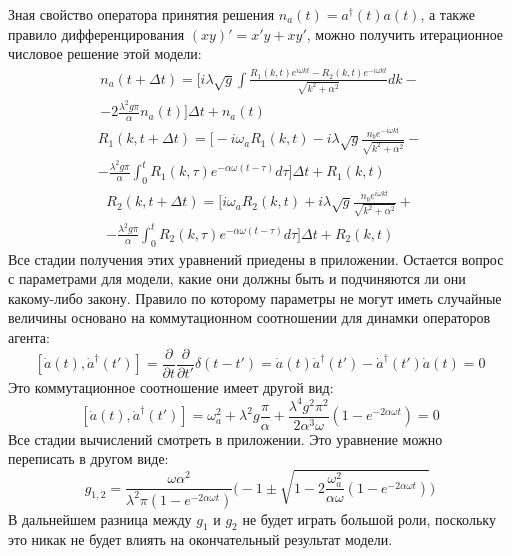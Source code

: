 Зная свойство оператора принятия решения $n_{a}(t) = a^{\dagger}(t) a(t)$, а также правило
дифференцирования $(xy)' = x'y + xy'$, можно получить итерационное числовое решение этой модели:
\begin{multline}
    n_{a}(t + \Delta t) =
    \Biggl[i \lambda \sqrt{g} \int \frac{R_{1}(k,t) e^{i \omega k t} - R_{2}(k,t) e^{-i \omega k t}}{\sqrt{k^{2} + \alpha^2}} dk - \\
    - 2 \frac{\lambda^{2} g \pi}{\alpha} n_{a}(t) \Biggr] \Delta t + n_{a}(t)
\end{multline}
\begin{multline}
    R_{1}(k,t + \Delta t) =
    \Biggl[-i \omega_{a} R_{1}(k,t)
    -i \lambda \sqrt{g} \frac{n_{b} e^{-i \omega k t}}{\sqrt{k^{2} + \alpha^2}} - \\
    -\frac{\lambda^{2} g \pi}{\alpha} \int_{0}^{t} R_{1}(k,\tau) e^{- \alpha \omega (t - \tau)} d\tau \Biggr] \Delta t + R_{1}(k,t)
\end{multline}
\begin{multline}
    R_{2}(k,t + \Delta t) =
    \Biggl[i \omega_{a} R_{2}(k,t)
    + i \lambda \sqrt{g} \frac{n_{b} e^{i \omega k t}}{\sqrt{k^{2} + \alpha^2}} + \\
    - \frac{\lambda^{2} g \pi}{\alpha} \int_{0}^{t} R_{2}(k,\tau) e^{- \alpha \omega (t - \tau)} d\tau \Biggr] \Delta t + R_{2}(k,t)
\end{multline}
Все стадии получения этих уравнений приедены в приложении.
Остается вопрос с параметрами для модели, какие они должны быть и подчиняются ли они какому-либо закону.
Правило по которому параметры не могут иметь случайные величины основано на коммутационном соотношении
для динамки операторов агента:
\begin{equation}\label{dynamic_comm-1}
    [\dot{a}(t),\dot{a}^{\dagger}(t')] = \frac{\partial}{\partial t} \frac{\partial}{\partial t'} \delta (t-t') =
    \dot{a}(t) \dot{a}^{\dagger}(t') - \dot{a}^{\dagger}(t') \dot{a}(t) = 0
\end{equation}
Это коммутационное соотношение имеет другой вид:
\begin{equation}\label{dynamic_comm}
    [\dot{a}(t),\dot{a}^{\dagger}(t')] = \omega^{2}_{a} + \lambda^{2} g \frac{\pi}{\alpha} +
    \frac{\lambda^{4} g^{2} \pi^{2}}{2 \alpha^{3} \omega} (1-e^{-2 \alpha \omega t}) = 0
\end{equation}
Все стадии вычислений смотреть в приложении.
Это уравнение можно переписать в другом виде:
\begin{equation}
    g_{1,2} = \frac{\omega \alpha^{2}}{\lambda^{2} \pi (1-e^{-2 \alpha \omega t})}
    \Biggl( -1 \pm \sqrt{1 - 2 \frac{\omega^{2}_{a} }{\alpha \omega} (1-e^{-2 \alpha \omega t})} \Biggr)
\end{equation}
В дальнейшем разница между $g_{1}$ и $g_{2}$ не будет играть большой роли, поскольку это никак не будет
влиять на окончательный результат модели.

